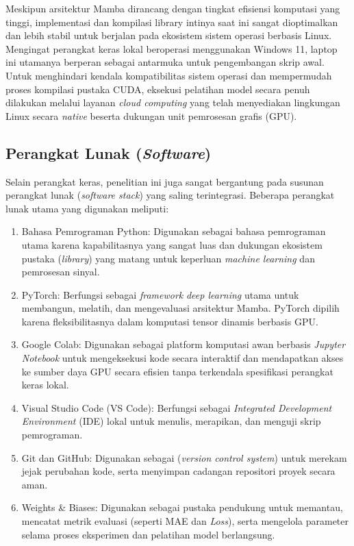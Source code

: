 Meskipun arsitektur Mamba dirancang dengan tingkat efisiensi komputasi yang tinggi, implementasi dan kompilasi library intinya saat ini sangat dioptimalkan dan lebih stabil untuk berjalan pada ekosistem sistem operasi berbasis Linux. Mengingat perangkat keras lokal beroperasi menggunakan Windows 11, laptop ini utamanya berperan sebagai antarmuka untuk pengembangan skrip awal. Untuk menghindari kendala kompatibilitas sistem operasi dan mempermudah proses kompilasi pustaka CUDA, eksekusi pelatihan model secara penuh dilakukan melalui layanan \textit{cloud computing} yang telah menyediakan lingkungan Linux secara \textit{native} beserta dukungan unit pemrosesan grafis (GPU).

\subsection{Perangkat Lunak (\textit{Software})}
Selain perangkat keras, penelitian ini juga sangat bergantung pada susunan perangkat lunak (\textit{software stack}) yang saling terintegrasi. Beberapa perangkat lunak utama yang digunakan meliputi:
\begin{enumerate}
    \item Bahasa Pemrograman Python: Digunakan sebagai bahasa pemrograman utama karena kapabilitasnya yang sangat luas dan dukungan ekosistem pustaka (\textit{library}) yang matang untuk keperluan \textit{machine learning} dan pemrosesan sinyal.
    \item PyTorch: Berfungsi sebagai \textit{framework} \textit{deep learning} utama untuk membangun, melatih, dan mengevaluasi arsitektur Mamba. PyTorch dipilih karena fleksibilitasnya dalam komputasi tensor dinamis berbasis GPU.
    \item Google Colab: Digunakan sebagai platform komputasi awan berbasis \textit{Jupyter Notebook} untuk mengeksekusi kode secara interaktif dan mendapatkan akses ke sumber daya GPU secara efisien tanpa terkendala spesifikasi perangkat keras lokal.
    \item Visual Studio Code (VS Code): Berfungsi sebagai \textit{Integrated Development Environment} (IDE) lokal untuk menulis, merapikan, dan menguji skrip pemrograman.
    \item Git dan GitHub: Digunakan sebagai (\textit{version control system}) untuk merekam jejak perubahan kode, serta menyimpan cadangan repositori proyek secara aman.
    \item Weights \& Biases: Digunakan sebagai pustaka pendukung untuk memantau, mencatat metrik evaluasi (seperti MAE dan \textit{Loss}), serta mengelola parameter selama proses eksperimen dan pelatihan model berlangsung.
\end{enumerate}

